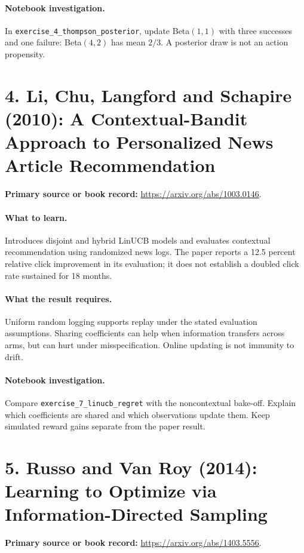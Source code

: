 \documentclass[11pt]{scrartcl}
\begin{document}
\paragraph{Notebook investigation.} In \texttt{exercise\_4\_thompson\_posterior}, update Beta$(1,1)$ with three successes and one failure: Beta$(4,2)$ has mean $2/3$. A posterior draw is not an action propensity.

\section*{4. Li, Chu, Langford and Schapire (2010): A Contextual-Bandit Approach to Personalized News Article Recommendation}
\textbf{Primary source or book record:} \url{https://arxiv.org/abs/1003.0146}.

\paragraph{What to learn.} Introduces disjoint and hybrid LinUCB models and evaluates contextual recommendation using randomized news logs. The paper reports a 12.5 percent relative click improvement in its evaluation; it does not establish a doubled click rate sustained for 18 months.

\paragraph{What the result requires.} Uniform random logging supports replay under the stated evaluation assumptions. Sharing coefficients can help when information transfers across arms, but can hurt under misspecification. Online updating is not immunity to drift.

\paragraph{Notebook investigation.} Compare \texttt{exercise\_7\_linucb\_regret} with the noncontextual bake-off. Explain which coefficients are shared and which observations update them. Keep simulated reward gains separate from the paper result.

\section*{5. Russo and Van Roy (2014): Learning to Optimize via Information-Directed Sampling}
\textbf{Primary source or book record:} \url{https://arxiv.org/abs/1403.5556}.
\end{document}
